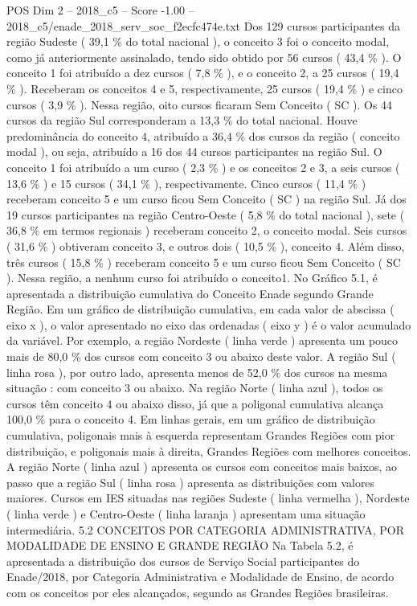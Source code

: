 \begin{textsample}{POS Dim 2 – 2018\_c5 – Score -1.00 – 2018\_c5/enade\_2018\_serv\_soc\_f2ecfc474e.txt}
Dos 129 cursos participantes da região Sudeste ( 39,1 \% do total nacional ), o conceito 3 foi o conceito modal, como já anteriormente assinalado, tendo sido obtido por 56 cursos ( 43,4 \% ).
O conceito 1 foi atribuído a dez cursos ( 7,8 \% ), e o conceito 2, a 25 cursos ( 19,4 \% ).
Receberam os conceitos 4 e 5, respectivamente, 25 cursos ( 19,4 \% ) e cinco cursos ( 3,9 \% ).
Nessa região, oito cursos ficaram Sem Conceito ( SC ).
Os 44 cursos da região Sul corresponderam a 13,3 \% do total nacional.
Houve predominância do conceito 4, atribuído a 36,4 \% dos cursos da região ( conceito modal ), ou seja, atribuído a 16 dos 44 cursos participantes na região Sul.
O conceito 1 foi atribuído a um curso ( 2,3 \% ) e os conceitos 2 e 3, a seis cursos ( 13,6 \% ) e 15 cursos ( 34,1 \% ), respectivamente.
Cinco cursos ( 11,4 \% ) receberam conceito 5 e um curso ficou Sem Conceito ( SC ) na região Sul.
Já dos 19 cursos participantes na região Centro-Oeste ( 5,8 \% do total nacional ), sete ( 36,8 \% em termos regionais ) receberam conceito 2, o conceito modal.
Seis cursos ( 31,6 \% ) obtiveram conceito 3, e outros dois ( 10,5 \% ), conceito 4.
Além disso, três cursos ( 15,8 \% ) receberam conceito 5 e um curso ficou Sem Conceito ( SC ).
Nessa região, a nenhum curso foi atribuído o conceito1.
No Gráfico 5.1, é apresentada a distribuição cumulativa do Conceito Enade segundo Grande Região.
Em um gráfico de distribuição cumulativa, em cada valor de abscissa ( eixo x ), o valor apresentado no eixo das ordenadas ( eixo y ) é o valor acumulado da variável.
Por exemplo, a região Nordeste ( linha verde ) apresenta um pouco mais de 80,0 \% dos cursos com conceito 3 ou abaixo deste valor.
A região Sul ( linha rosa ), por outro lado, apresenta menos de 52,0 \% dos cursos na mesma situação : com conceito 3 ou abaixo.
Na região Norte ( linha azul ), todos os cursos têm conceito 4 ou abaixo disso, já que a poligonal cumulativa alcança 100,0 \% para o conceito 4.
Em linhas gerais, em um gráfico de distribuição cumulativa, poligonais mais à esquerda representam Grandes Regiões com pior distribuição, e poligonais mais à direita, Grandes Regiões com melhores conceitos.
A região Norte ( linha azul ) apresenta os cursos com conceitos mais baixos, ao passo que a região Sul ( linha rosa ) apresenta as distribuições com valores maiores.
Cursos em IES situadas nas regiões Sudeste ( linha vermelha ), Nordeste ( linha verde ) e Centro-Oeste ( linha laranja ) apresentam uma situação intermediária. 5.2 CONCEITOS POR CATEGORIA ADMINISTRATIVA, POR MODALIDADE DE ENSINO E GRANDE REGIÃO Na Tabela 5.2, é apresentada a distribuição dos cursos de Serviço Social participantes do Enade/2018, por Categoria Administrativa e Modalidade de Ensino, de acordo com os conceitos por eles alcançados, segundo as Grandes Regiões brasileiras.

\end{textsample}
